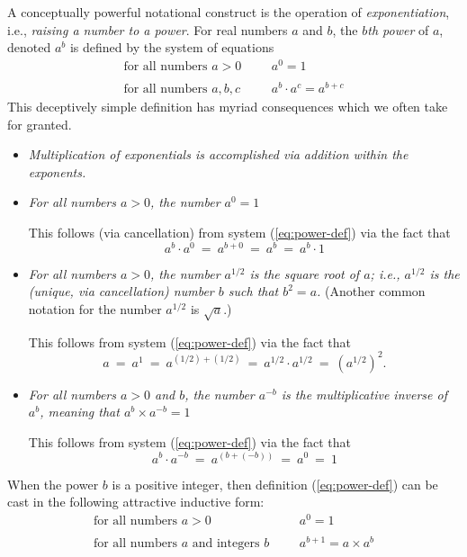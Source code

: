 A conceptually powerful notational construct is the operation of {\it exponentiation},  i.e., {\it raising a number to a power}.  For real numbers $a$ and $b$, the {\it $b$th power} of $a$, denoted $a^b$ is defined by the system of equations
\begin{equation}
\label{eq:power-def}
\begin{array}{llll}
\mbox{for all numbers $a>0$} & & & a^0 = 1 \\
 & & & \\
\mbox{for all numbers $a, b, c$} & & & a^b \cdot a^c = a^{b+c}
\end{array}
\end{equation}
This deceptively simple definition has myriad consequences which we often take for granted.
 
\begin{itemize}
\item
{\em Multiplication of exponentials is accomplished via addition within the exponents.}

\item
{\em For all numbers $a>0$, the number $a^0 = 1$}

\smallskip

This follows (via cancellation) from system (\ref{eq:power-def}) via the fact that
\[ a^b \cdot a^0 \ = \ a^{b+0} \ = \ a^b \ = \ a^b \cdot 1  \]

\item
{\em For all numbers $a >0$, the number $a^{1/2}$ is the {\it square root} of $a$; i.e., $a^{1/2}$ is the (unique, via cancellation) number $b$ such that $b^2 = a$.}
(Another common notation for the number $a^{1/2}$ is $\sqrt{a}$.)

\smallskip

This follows from system (\ref{eq:power-def}) via the fact that
\[ a \ = \ a^1 \ = \ a^{(1/2) + (1/2)} \ = \ a^{1/2} \cdot a^{1/2} \ = \ \left(a^{1/2}\right)^2. \]

\item
{\em For all numbers $a>0$ and $b$, the number $a^{-b}$ is the {\it multiplicative inverse} of $a^b$, meaning that $a^b \times a^{-b} = 1$}

\smallskip

This follows from system (\ref{eq:power-def}) via the fact that
\[ a^b \cdot a^{-b} \ = \ a^{(b + (-b))} \ = \ a^0 \ = \  1 \]
\end{itemize}
When the power $b$ is a positive integer, then definition (\ref{eq:power-def}) can be cast in the following attractive inductive form:
\begin{equation}
\label{eq:power-def-integer}
\begin{array}{llll}
\mbox{for all numbers $a>0$} & & & a^0 = 1 \\
 & & & \\
\mbox{for all numbers $a$ and integers $b$} & & & a^{b+1} = a \times a^b
\end{array}
\end{equation}

